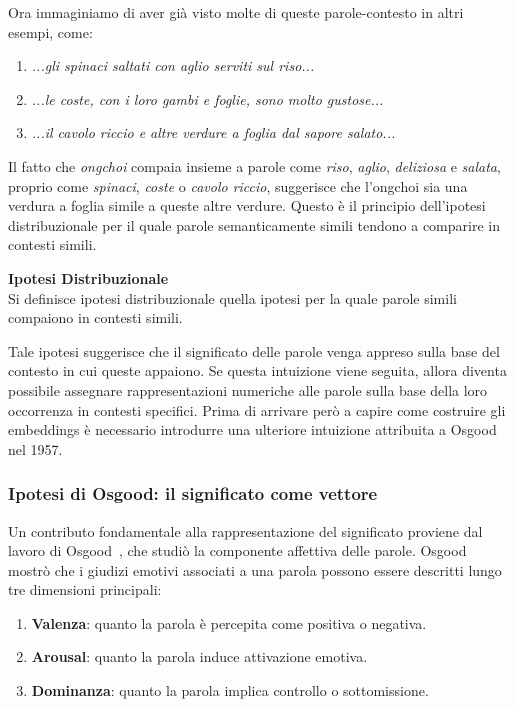 Ora immaginiamo di aver già visto molte di queste parole-contesto in altri esempi, come:

\begin{enumerate}
    \item \textit{...gli spinaci saltati con aglio serviti sul riso...}
    \item \textit{...le coste, con i loro gambi e foglie, sono molto gustose...}
    \item \textit{...il cavolo riccio e altre verdure a foglia dal sapore salato...}
\end{enumerate}

Il fatto che \textit{ongchoi} compaia insieme a parole come \textit{riso}, \textit{aglio}, \textit{deliziosa} e \textit{salata}, proprio come \textit{spinaci}, \textit{coste} o \textit{cavolo riccio}, suggerisce che l'ongchoi sia una verdura a foglia simile a queste altre verdure. Questo è il principio dell'ipotesi distribuzionale per il quale parole semanticamente simili tendono a comparire in contesti simili.

\begin{notebox}
\textbf{Ipotesi Distribuzionale}\\
Si definisce ipotesi distribuzionale quella ipotesi per la quale parole simili compaiono in contesti simili. 
\end{notebox}

Tale ipotesi suggerisce che il significato delle parole venga appreso sulla base del contesto in cui queste appaiono. Se questa intuizione viene seguita, allora diventa possibile assegnare rappresentazioni numeriche alle parole sulla base della loro occorrenza in contesti specifici. Prima di arrivare però a capire come costruire gli embeddings è necessario introdurre una ulteriore intuizione attribuita a Osgood~\parencite{Osgood1957Measurement} nel 1957.

\subsubsection{Ipotesi di Osgood: il significato come vettore}
\label{subsubsec:osgood_hypothesis}

Un contributo fondamentale alla rappresentazione del significato proviene dal lavoro di Osgood~\parencite{Osgood1957Measurement}, che studiò la componente affettiva delle parole. Osgood mostrò che i giudizi emotivi associati a una parola possono essere descritti lungo tre dimensioni principali:

\begin{enumerate}
    \item \textbf{Valenza}: quanto la parola è percepita come positiva o negativa.
    \item \textbf{Arousal}: quanto la parola induce attivazione emotiva.
    \item \textbf{Dominanza}: quanto la parola implica controllo o sottomissione.
\end{enumerate}

